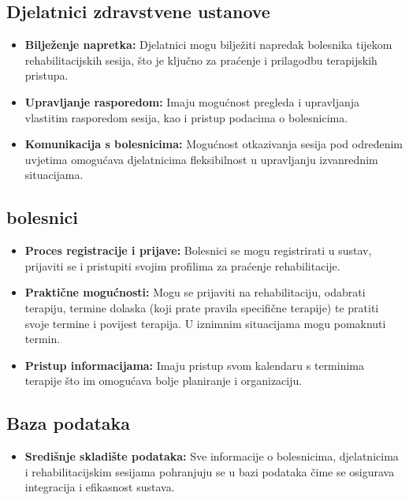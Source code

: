         \subsection*{Djelatnici zdravstvene ustanove}
        \begin{itemize}
            \item \textbf{Bilježenje napretka:} Djelatnici mogu bilježiti napredak bolesnika tijekom rehabilitacijskih sesija, što je ključno za praćenje i prilagodbu terapijskih pristupa.
        
            \item \textbf{Upravljanje rasporedom:} Imaju mogućnost pregleda i upravljanja vlastitim rasporedom sesija, kao i pristup podacima o bolesnicima.
        
            \item \textbf{Komunikacija s bolesnicima:} Mogućnost otkazivanja sesija pod određenim uvjetima omogućava djelatnicima fleksibilnost u upravljanju izvanrednim situacijama.
        \end{itemize}
        
        \subsection*{bolesnici}
        \begin{itemize}
            \item \textbf{Proces registracije i prijave:} Bolesnici se mogu registrirati u sustav, prijaviti se i pristupiti svojim profilima za praćenje rehabilitacije.
        
            \item \textbf{Praktične mogućnosti:} Mogu se prijaviti na rehabilitaciju, odabrati terapiju, termine dolaska (koji prate pravila specifične terapije) te pratiti svoje termine i povijest terapija. U iznimnim situacijama mogu pomaknuti termin. 
        
            \item \textbf{Pristup informacijama:} Imaju pristup svom kalendaru s terminima terapije što im omogućava bolje planiranje i organizaciju.
        \end{itemize}
        
        \subsection*{Baza podataka}
        \begin{itemize}
            \item \textbf{Središnje skladište podataka:} Sve informacije o bolesnicima, djelatnicima i rehabilitacijskim sesijama pohranjuju se u bazi podataka čime se osigurava integracija i efikasnost sustava.
        \end{itemize}
        

